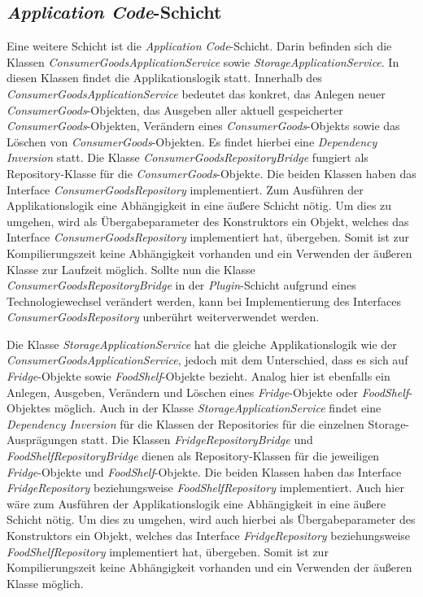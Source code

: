 \subsection*{\textit{Application Code}-Schicht}
Eine weitere Schicht ist die \textit{Application Code}-Schicht.
Darin befinden sich die Klassen \textit{ConsumerGoodsApplicationService} sowie \textit{StorageApplicationService}.
In diesen Klassen findet die Applikationslogik statt.
Innerhalb des \textit{ConsumerGoodsApplicationService} bedeutet das konkret, das Anlegen neuer \textit{ConsumerGoods}-Objekten, das Ausgeben aller aktuell gespeicherter \textit{ConsumerGoods}-Objekten, Verändern eines \textit{ConsumerGoods}-Objekts sowie das Löschen von \textit{ConsumerGoods}-Objekten.
Es findet hierbei eine \textit{Dependency Inversion} statt.
Die Klasse \textit{ConsumerGoodsRepositoryBridge} fungiert als Repository-Klasse für die \textit{ConsumerGoods}-Objekte. Die beiden Klassen haben das Interface \textit{ConsumerGoodsRepository} implementiert.
Zum Ausführen der Applikationslogik eine Abhängigkeit in eine äußere Schicht nötig. 
Um dies zu umgehen, wird als Übergabeparameter des Konstruktors ein Objekt, welches das Interface \textit{ConsumerGoodsRepository} implementiert hat, übergeben.
Somit ist zur Kompilierungszeit keine Abhängigkeit vorhanden und ein Verwenden der äußeren Klasse zur Laufzeit möglich.
Sollte nun die Klasse \textit{ConsumerGoodsRepositoryBridge} in der \textit{Plugin}-Schicht aufgrund eines Technologiewechsel verändert werden, kann bei Implementierung des Interfaces \textit{ConsumerGoodsRepository} unberührt weiterverwendet werden.

Die Klasse \textit{StorageApplicationService} hat die gleiche Applikationslogik wie der \textit{ConsumerGoodsApplicationService}, jedoch mit dem Unterschied, dass es sich auf \textit{Fridge}-Objekte sowie \textit{FoodShelf}-Objekte bezieht.
Analog hier ist ebenfalls ein Anlegen, Ausgeben, Verändern und Löschen eines \textit{Fridge}-Objekte oder \textit{FoodShelf}-Objektes möglich.
Auch in der Klasse \textit{StorageApplicationService} findet eine \textit{Dependency Inversion} für die Klassen der Repositories für die einzelnen Storage-Ausprägungen statt.
Die Klassen \textit{FridgeRepositoryBridge} und \textit{FoodShelfRepositoryBridge} dienen als Repository-Klassen für die jeweiligen \textit{Fridge}-Objekte und \textit{FoodShelf}-Objekte. Die beiden Klassen haben das Interface \textit{FridgeRepository} beziehungsweise \textit{FoodShelfRepository} implementiert.
Auch hier wäre zum Ausführen der Applikationslogik eine Abhängigkeit in eine äußere Schicht nötig. Um dies zu umgehen, wird auch hierbei als Übergabeparameter des Konstruktors ein Objekt, welches das Interface \textit{FridgeRepository} beziehungsweise \textit{FoodShelfRepository} implementiert hat, übergeben.
Somit ist zur Kompilierungszeit keine Abhängigkeit vorhanden und ein Verwenden der äußeren Klasse möglich.

